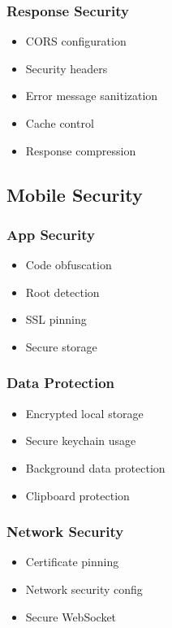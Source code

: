 \subsubsection{Response Security}
\begin{itemize}
    \item CORS configuration
    \item Security headers
    \item Error message sanitization
    \item Cache control
    \item Response compression
\end{itemize}

\subsection{Mobile Security}

\subsubsection{App Security}
\begin{itemize}
    \item Code obfuscation
    \item Root detection
    \item SSL pinning
    \item Secure storage
\end{itemize}

\subsubsection{Data Protection}
\begin{itemize}
    \item Encrypted local storage
    \item Secure keychain usage
    \item Background data protection
    \item Clipboard protection
\end{itemize}

\subsubsection{Network Security}
\begin{itemize}
    \item Certificate pinning
    \item Network security config
    \item Secure WebSocket
\end{itemize}

